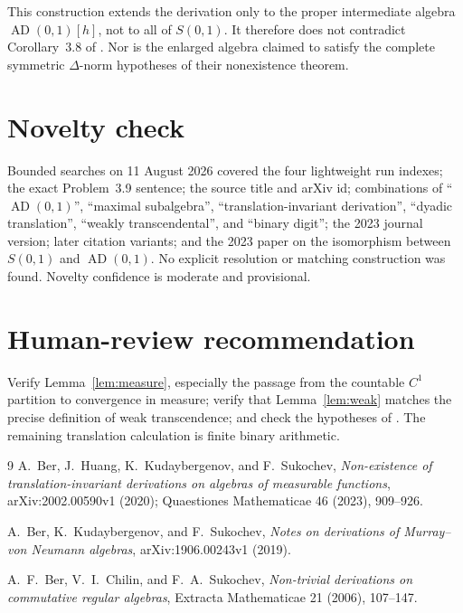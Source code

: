 \documentclass[11pt]{article}
\newcommand{\AD}{\operatorname{AD}}
\newcommand{\1}{\mathbf 1}
\begin{document}
This construction extends the derivation only to the proper intermediate
algebra $\AD(0,1)[h]$, not to all of $S(0,1)$.  It therefore does not
contradict Corollary~3.8 of \cite{BHKS}.  Nor is the enlarged algebra claimed
to satisfy the complete symmetric $\Delta$-norm hypotheses of their
nonexistence theorem.

\section{Novelty check}

Bounded searches on 11 August 2026 covered the four lightweight run indexes;
the exact Problem~3.9 sentence; the source title and arXiv id; combinations of
``$\AD(0,1)$'', ``maximal subalgebra'', ``translation-invariant derivation'',
``dyadic translation'', ``weakly transcendental'', and ``binary digit''; the
2023 journal version; later citation variants; and the 2023 paper on the
isomorphism between $S(0,1)$ and $\AD(0,1)$.  No explicit resolution or
matching construction was found.  Novelty confidence is moderate and
provisional.

\section{Human-review recommendation}

Verify Lemma~\ref{lem:measure}, especially the passage from the countable
$C^1$ partition to convergence in measure; verify that Lemma~\ref{lem:weak}
matches the precise definition of weak transcendence; and check the
hypotheses of \cite[Proposition~3.7]{BCS}.  The remaining translation
calculation is finite binary arithmetic.

\small
\begin{thebibliography}{9}
A.~Ber, J.~Huang, K.~Kudaybergenov, and F.~Sukochev,
\emph{Non-existence of translation-invariant derivations on algebras of
measurable functions}, arXiv:2002.00590v1 (2020); Quaestiones Mathematicae
46 (2023), 909--926.

A.~Ber, K.~Kudaybergenov, and F.~Sukochev,
\emph{Notes on derivations of Murray--von Neumann algebras},
arXiv:1906.00243v1 (2019).

A.~F.~Ber, V.~I.~Chilin, and F.~A.~Sukochev,
\emph{Non-trivial derivations on commutative regular algebras},
Extracta Mathematicae 21 (2006), 107--147.
\end{thebibliography}
\end{document}
